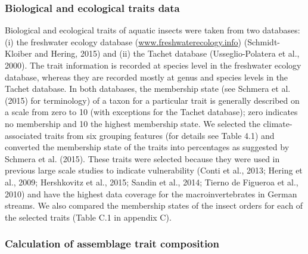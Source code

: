 \subsubsection{Biological and ecological traits data}
\label{Biological and ecological traits data}

Biological and ecological traits of aquatic insects were taken from two databases: (i) the freshwater ecology database (\href{http://www.freshwaterecology.info}{www.freshwaterecology.info}) (Schmidt-Kloiber and Hering, 2015) and (ii) the Tachet database (Usseglio-Polatera et al., 2000). The trait information is recorded at species level in the freshwater ecology database, whereas they are recorded mostly at genus and species levels in the Tachet database. In both databases, the membership state (see Schmera et al. (2015) for terminology) of a taxon for a particular trait is generally described on a scale from zero to 10 (with exceptions for the Tachet database); zero indicates no membership and 10 the highest membership state. We selected the climate-associated traits from six grouping features (for details see Table 4.1) and converted the membership state of the traits into percentages as suggested by Schmera et al. (2015). These traits were selected because they were used in previous large scale studies to indicate vulnerability (Conti et al., 2013; Hering et al., 2009; Hershkovitz et al., 2015; Sandin et al., 2014; Tierno de Figueroa et al., 2010) and have the highest data coverage for the macroinvertebrates in German streams. We also compared the membership states of the insect orders for each of the selected traits (Table C.1 in appendix C).

\subsubsection{Calculation of assemblage trait composition}
\label{Calculation of assemblage trait composition}

